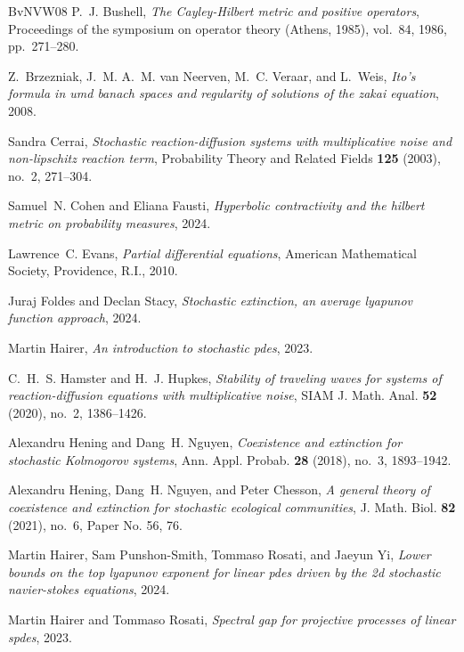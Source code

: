 \documentclass[final]{amsart}
\numberwithin{thm}{section}
\numberwithin{equation}{section}
\begin{document}
\begin{thebibliography}{BvNVW08}
P.~J. Bushell, \emph{The {C}ayley-{H}ilbert metric and positive operators},
  Proceedings of the symposium on operator theory ({A}thens, 1985), vol.~84,
  1986, pp.~271--280. 

Z.~Brzezniak, J.~M. A.~M. van Neerven, M.~C. Veraar, and L.~Weis, \emph{Ito's
  formula in umd banach spaces and regularity of solutions of the zakai
  equation}, 2008.

Sandra Cerrai, \emph{Stochastic reaction-diffusion systems with multiplicative
  noise and non-lipschitz reaction term}, Probability Theory and Related Fields
  \textbf{125} (2003), no.~2, 271–304.

Samuel~N. Cohen and Eliana Fausti, \emph{Hyperbolic contractivity and the
  hilbert metric on probability measures}, 2024.

Lawrence~C. Evans, \emph{Partial differential equations}, American Mathematical
  Society, Providence, R.I., 2010.

Juraj Foldes and Declan Stacy, \emph{Stochastic extinction, an average lyapunov
  function approach}, 2024.

Martin Hairer, \emph{An introduction to stochastic pdes}, 2023.

C.~H.~S. Hamster and H.~J. Hupkes, \emph{Stability of traveling waves for
  systems of reaction-diffusion equations with multiplicative noise}, SIAM J.
  Math. Anal. \textbf{52} (2020), no.~2, 1386--1426. 

Alexandru Hening and Dang~H. Nguyen, \emph{Coexistence and extinction for
  stochastic {K}olmogorov systems}, Ann. Appl. Probab. \textbf{28} (2018),
  no.~3, 1893--1942. 

Alexandru Hening, Dang~H. Nguyen, and Peter Chesson, \emph{A general theory of
  coexistence and extinction for stochastic ecological communities}, J. Math.
  Biol. \textbf{82} (2021), no.~6, Paper No. 56, 76. 

Martin Hairer, Sam Punshon-Smith, Tommaso Rosati, and Jaeyun Yi, \emph{Lower
  bounds on the top lyapunov exponent for linear pdes driven by the 2d
  stochastic navier-stokes equations}, 2024.

Martin Hairer and Tommaso Rosati, \emph{Spectral gap for projective processes
  of linear spdes}, 2023.


\end{thebibliography}
\end{document}
